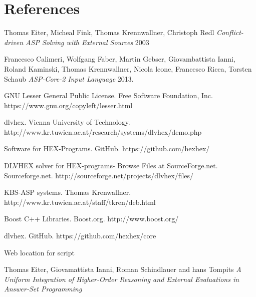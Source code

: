 \documentclass[14pt,a4paper, titlepage]{article}
\begin{document}
\section{References}
\begin{thebibliography}{1}
 Thomas Eiter, Micheal Fink, Thomas Krennwallner, Christoph Redl {\em Conflict-driven ASP Solving with External Sources} 2003   
  
 Francesco Calimeri, Wolfgang Faber, Martin Gebser, Giovambattista Ianni, Roland Kaminski, Thomas Krennwallner, Nicola leone, Francesco Ricca, Torsten Schaub {\em ASP-Core-2 Input Language} 2013.

 GNU Lesser General Public License. Free Software Foundation, Inc. https://www.gnu.org/copyleft/lesser.html 

dlvhex. Vienna University of Technology. http://www.kr.tuwien.ac.at/research/systems/dlvhex/demo.php 

Software for HEX-Programs. GitHub. https://github.com/hexhex/ 

DLVHEX solver for HEX-programs-  Browse Files at SourceForge.net. Sourceforge.net. http://sourceforge.net/projects/dlvhex/files/

KBS-ASP systems. Thomas Krenwallner. http://www.kr.tuwien.ac.at/staff/tkren/deb.html

Boost C++ Libraries. Boost.org. http://www.boost.org/

dlvhex. GitHub. https://github.com/hexhex/core

Web location for script

Thomas Eiter, Giovamattista Ianni, Roman Schindlauer and hans Tompits {\em A Uniform Integration of Higher-Order Reasoning and External Evaluations in Answer-Set Programming} 
      
 
 \end{thebibliography} 
\end{document}
